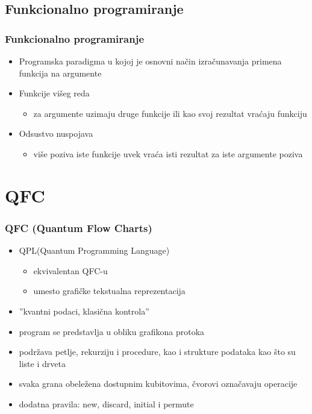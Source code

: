 \documentclass[12pt,hyperref={unicode}]{beamer}
\begin{document}
\subsection{Funkcionalno programiranje}

\begin{frame}
\frametitle{Funkcionalno programiranje}
\begin{itemize}
\item{Programska paradigma u kojoj je osnovni način izračunavanja primena funkcija na argumente}\cite{p4}
\item{Funkcije višeg reda}
    \begin{itemize}
    \item{za argumente uzimaju druge funkcije ili kao svoj rezultat vraćaju funkciju }
    \end{itemize}
\item{Odsustvo nuspojava}
  	\begin{itemize}
	\item{više poziva iste funkcije uvek vraća isti rezultat za iste argumente poziva}
  	\end{itemize}
\end{itemize}

\end{frame}

\section{QFC}

\begin{frame}
\frametitle{QFC (Quantum Flow Charts)}
\begin{itemize}
\item{QPL(Quantum Programming Language)}
	\begin{itemize}
	\item{ekvivalentan QFC-u}
    \item{umesto grafičke tekstualna reprezentacija}
	\end{itemize}
\item{''kvantni podaci, klasična kontrola''}\cite{p1}
\item{program se predstavlja u obliku grafikona protoka}
\item{podržava petlje, rekurziju i procedure, kao i strukture podataka kao što su liste i drveta}
\item{svaka grana obeležena dostupnim kubitovima, čvorovi označavaju operacije}
\item{dodatna pravila: new, discard, initial i permute}
\end{itemize}
\end{frame}
\end{document}
